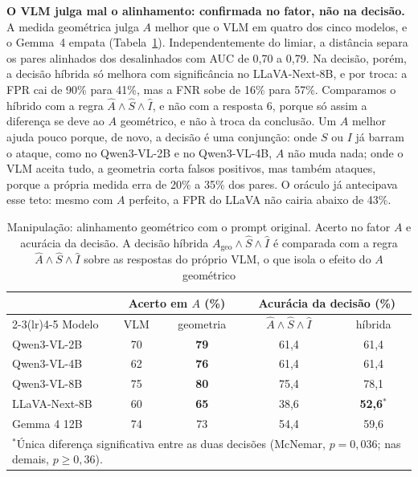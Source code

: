 \documentclass[conference]{IEEEtran}
\newcommand{\Ageo}{A_{\mathrm{geo}}}
\begin{document}
\textbf{O VLM julga mal o alinhamento: confirmada no fator, não na decisão.} A medida geométrica julga $A$
melhor que o VLM em quatro dos cinco modelos, e o Gemma~4 empata (Tabela~\ref{tab:c2}). Independentemente
do limiar, a distância separa os pares alinhados dos desalinhados com AUC de 0,70 a 0,79. Na decisão,
porém, a decisão híbrida só melhora com significância no LLaVA-Next-8B, e por troca: a FPR cai de 90\%
para 41\%, mas a FNR sobe de 16\% para 57\%. Comparamos o híbrido com a regra
$\hat A\wedge\hat S\wedge\hat I$, e não com a resposta 6, porque só assim a diferença se deve ao $A$
geométrico, e não à troca da conclusão. Um $A$ melhor ajuda pouco porque, de novo, a decisão é uma
conjunção: onde $S$ ou $I$ já barram o ataque, como no Qwen3-VL-2B e no Qwen3-VL-4B, $A$ não muda nada;
onde o VLM aceita tudo, a geometria corta falsos positivos, mas também ataques, porque a própria medida
erra de 20\% a 35\% dos pares. O oráculo já antecipava esse teto: mesmo com $A$ perfeito, a FPR do LLaVA
não cairia abaixo de 43\%.

\begin{table}[!t]
\renewcommand{\arraystretch}{1.05}
\caption{Manipulação: alinhamento geométrico com o prompt original. Acerto no fator $A$ e acurácia da
decisão. A decisão híbrida $\Ageo\wedge\hat S\wedge\hat I$ é comparada com a regra
$\hat A\wedge\hat S\wedge\hat I$ sobre as respostas do próprio VLM, o que isola o efeito do $A$
geométrico}
\label{tab:c2}
\centering
\footnotesize
\setlength{\tabcolsep}{4pt}
\begin{tabular}{lcccc}
\toprule
 & \multicolumn{2}{c}{Acerto em $A$ (\%)} & \multicolumn{2}{c}{Acurácia da decisão (\%)} \\
\cmidrule(lr){2-3}\cmidrule(lr){4-5}
Modelo & VLM & geometria & $\hat A\wedge\hat S\wedge\hat I$ & híbrida \\
\midrule
Qwen3-VL-2B   & 70 & \textbf{79} & 61,4 & 61,4 \\
Qwen3-VL-4B   & 62 & \textbf{76} & 61,4 & 61,4 \\
Qwen3-VL-8B   & 75 & \textbf{80} & 75,4 & 78,1 \\
LLaVA-Next-8B & 60 & \textbf{65} & 38,6 & \textbf{52,6}$^{*}$ \\
Gemma 4 12B   & 74 & 73 & 54,4 & 59,6 \\
\bottomrule
\multicolumn{5}{L{7.4cm}}{\scriptsize $^{*}$Única diferença significativa entre as duas decisões
(McNemar, $p=0{,}036$; nas demais, $p\geq 0{,}36$).}
\end{tabular}
\end{table}
\end{document}
